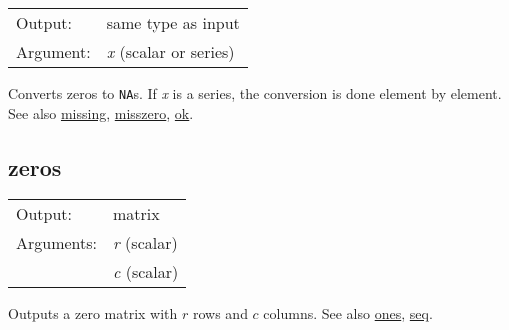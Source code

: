 \begin{tabular}{ll}
Output:     & same type as input\\
Argument:   & \textsl{x} (scalar or series)\\
\end{tabular}

	  Converts zeros to \texttt{NA}s. If \textsl{x} is a
	  series, the conversion is done element by element.
	  See also \hyperlink{func-missing}{missing}, \hyperlink{func-misszero}{misszero}, \hyperlink{func-ok}{ok}.

\subsection{zeros}
\hypertarget{func-zeros}{}

\begin{tabular}{ll}
Output:     & matrix\\
Arguments:  & \textsl{r} (scalar)\\
           & \textsl{c} (scalar)\\
\end{tabular}

	  Outputs a zero matrix with \ensuremath{r} rows and
	  \ensuremath{c} columns. 
	  See also \hyperlink{func-ones}{ones}, \hyperlink{func-seq}{seq}.

